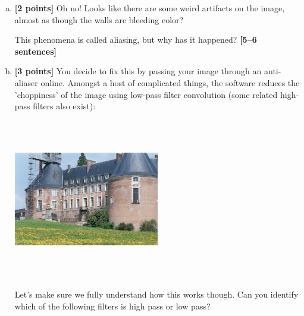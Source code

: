 \documentclass[11pt]{article}
\begin{document}
\begin{enumerate}[(a)]
\item \textbf{[2 points]} Oh no! Looks like there are some weird artifacts on the image, almost as though the walls are bleeding color? 
    
    \begin{tcolorbox}[colback=orange!5!white,colframe=orange!75!black]
This phenomena is called aliasing, but why has it happened? \textbf{[5--6 sentences]}
\end{tcolorbox}

\item \textbf{[3 points]}
You decide to fix this by passing your image through an anti-aliaser online. Amongst a host of complicated things, the software reduces the 'choppiness' of the image using low-pass filter convolution (some related high-pass filters also exist):

\includegraphics[width=0.5\textwidth,height=7cm,keepaspectratio]{images/castle-after.jpg}

\begin{tcolorbox}[colback=orange!5!white,colframe=orange!75!black]
Let's make sure we fully understand how this works though. Can you identify which of the following filters is high pass or low pass?
\end{tcolorbox}


\end{enumerate}
\end{document}
